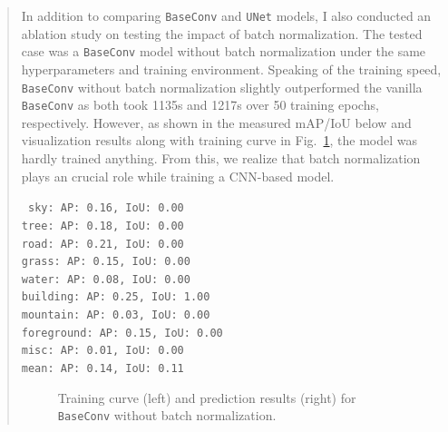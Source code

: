 \documentclass[11pt]{article}
\begin{document}
\begin{quote}
In addition to comparing \texttt{BaseConv} and \texttt{UNet} models, I also conducted an ablation study on testing the impact of batch normalization. The tested case was a \texttt{BaseConv} model without batch normalization under the same hyperparameters and training environment. Speaking of the training speed, \texttt{BaseConv} without batch normalization slightly outperformed the vanilla \texttt{BaseConv} as both took 1135s and 1217s over 50 training epochs, respectively. However, as shown in the measured mAP/IoU below and visualization results along with training curve in Fig.~\ref{fig:ablation-study}, the model was hardly trained anything. From this, we realize that batch normalization plays an crucial role while training a CNN-based model.

{\centering \tt \small
sky: AP: 0.16, IoU: 0.00 \\
tree: AP: 0.18, IoU: 0.00 \\
road: AP: 0.21, IoU: 0.00 \\
grass: AP: 0.15, IoU: 0.00 \\
water: AP: 0.08, IoU: 0.00 \\
building: AP: 0.25, IoU: 1.00 \\
mountain: AP: 0.03, IoU: 0.00 \\
foreground: AP: 0.15, IoU: 0.00 \\
misc: AP: 0.01, IoU: 0.00 \\
mean: AP: 0.14, IoU: 0.11 \\
}

\begin{figure}[h]
    \centering
    \qquad
    \caption{Training curve (left) and prediction results (right) for \texttt{BaseConv} without batch normalization.}
    \label{fig:ablation-study}
\end{figure}




\end{quote}
\end{document}
